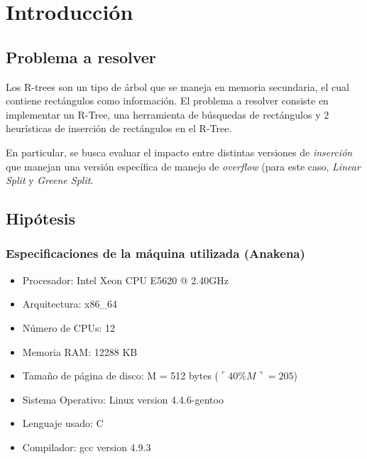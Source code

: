 \documentclass[letterpaper,10pt]{article}
\begin{document}
	\newpage

	\section{Introducción}

	\subsection{Problema a resolver}

	Los R-trees son un tipo de árbol que se maneja en memoria secundaria, el cual contiene rectángulos como información. El problema a resolver consiste en implementar un R-Tree,
	una herramienta de búsquedas de rectángulos y 2 heurísticas de inserción de rectángulos en el R-Tree.

	En particular, se busca evaluar el impacto entre distintas versiones de \textit{inserción} que manejan una versión específica de manejo de \textit{overflow} (para este caso,
	\textit{Linear Split} y \textit{Greene Split}.

	\subsection{Hipótesis}

	\subsubsection*{Especificaciones de la máquina utilizada (Anakena)}

	\begin{itemize}
		\item Procesador: Intel \textregistered Xeon \textregistered CPU E5620 @ 2.40GHz
		\item Arquitectura: x86\_64
		\item Número de CPUs: 12
		\item Memoria RAM: 12288 KB
		\item Tamaño de página de disco: M = 512 bytes ($\ulcorner40\% M\urcorner = 205$)
		\item Sistema Operativo: Linux version 4.4.6-gentoo
		\item Lenguaje usado: C
		\item Compilador: gcc version 4.9.3
	\end{itemize}
\end{document}
